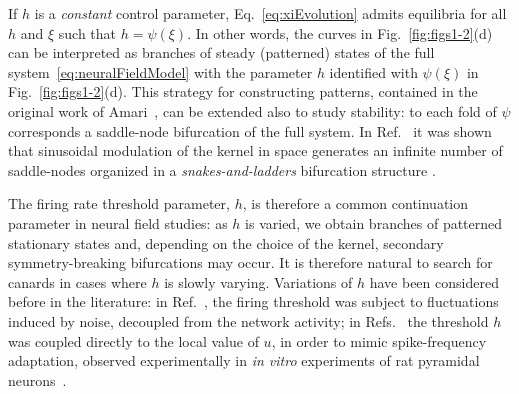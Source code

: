 \documentclass[aps,prl,reprint,superscriptaddress]{revtex4-1}
\newcommand{\edits}[1]{#1}
\begin{document}
If $h$ is a \emph{constant} control parameter, Eq.~\eqref{eq:xiEvolution} 
admits equilibria for all $h$ and $\xi$ such that $h = \psi(\xi)$. In other 
words, the curves in Fig.~\ref{fig:figs1-2}(d) can be interpreted as branches 
of steady (patterned) states of the full system~\eqref{eq:neuralFieldModel} with
the parameter $h$ identified with $\psi(\xi)$ in Fig.~\ref{fig:figs1-2}(d). 
This strategy for constructing patterns, contained in the original work of Amari~\cite{Amari1977aa},
can be extended also to study stability: to each fold of $\psi$ corresponds a
saddle-node bifurcation of the full system. In Ref.~\cite{Avitabile2015aa} it was shown
that \edits{sinusoidal modulation of the kernel in space generates an infinite number of saddle-nodes organized}
in a \emph{snakes-and-ladders} bifurcation structure \cite{Knobloch15}.


The firing rate threshold parameter, $h$, is therefore a common continuation
parameter in neural field studies: as $h$ is varied, we obtain branches of patterned
stationary states and, depending on the choice of the kernel, secondary symmetry-breaking
bifurcations may occur. It is therefore natural to search for canards in cases where
$h$ is slowly varying. Variations of $h$ have been considered before in the
literature: in Ref.~\cite{Brackley2007aa,Thul:2016gr}, the firing threshold was subject to
fluctuations induced by noise, decoupled from the network activity; in
Refs.~\cite{Coombes:2005hp,coombes2007exotic} the threshold $h$ was coupled directly
to the local value of $u$, in order to mimic spike-frequency adaptation, observed
experimentally in \emph{in vitro} experiments of rat pyramidal neurons~\cite{Madison:1984di}.
\end{document}
